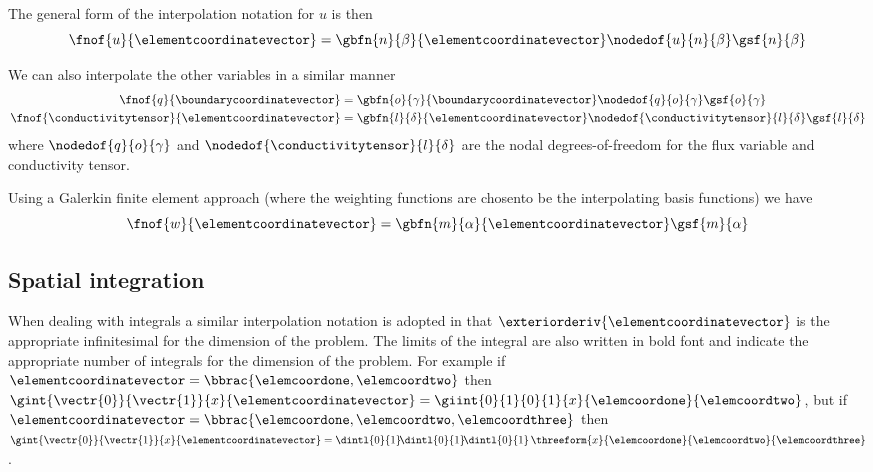 The general form of the interpolation notation for $u$ is then
\begin{equation}
  \fnof{u}{\elementcoordinatevector}=\gbfn{n}{\beta}{\elementcoordinatevector}\nodedof{u}{n}{\beta}\gsf{n}{\beta}
  \label{eqn:uInterpolationLaplace}
\end{equation}

We can also interpolate the other variables in a similar manner \ie
\begin{equation}
  \begin{split}
    \fnof{q}{\boundarycoordinatevector} &= \gbfn{o}{\gamma}{\boundarycoordinatevector}\nodedof{q}{o}{\gamma}\gsf{o}{\gamma} \\
    \fnof{\conductivitytensor}{\elementcoordinatevector}
    &=\gbfn{l}{\delta}{\elementcoordinatevector}\nodedof{\conductivitytensor}{l}{\delta}\gsf{l}{\delta} \\
  \end{split}
\end{equation}
where $\nodedof{q}{o}{\gamma}$ and $\nodedof{\conductivitytensor}{l}{\delta}$ are the
nodal degrees-of-freedom for the flux variable and conductivity tensor.

Using a Galerkin finite element approach (where the weighting functions are
chosento be the interpolating basis functions) we have 
\begin{equation}
  \fnof{w}{\elementcoordinatevector}=\gbfn{m}{\alpha}{\elementcoordinatevector}\gsf{m}{\alpha}
\end{equation}

\subsection{Spatial integration}

When dealing with integrals a similar interpolation notation is
adopted in that $\exteriorderiv{\elementcoordinatevector}$ is the
appropriate infinitesimal for the dimension of the problem. The limits
of the integral are also written in bold font and indicate the
appropriate number of integrals for the dimension of the problem.  For
example if
$\elementcoordinatevector=\bbrac{\elemcoordone,\elemcoordtwo}$ then
$\gint{\vectr{0}}{\vectr{1}}{x}
{\elementcoordinatevector}=\giint{0}{1}{0}{1}{x}{\elemcoordone}{\elemcoordtwo}$,
but if
$\elementcoordinatevector=\bbrac{\elemcoordone,\elemcoordtwo,\elemcoordthree}$
then $\gint{\vectr{0}}{\vectr{1}}{x}{\elementcoordinatevector}=
\dintl{0}{1}\!\dintl{0}{1}\!\dintl{0}{1}\,\threeform{x}{\elemcoordone}{\elemcoordtwo}{\elemcoordthree}$.

